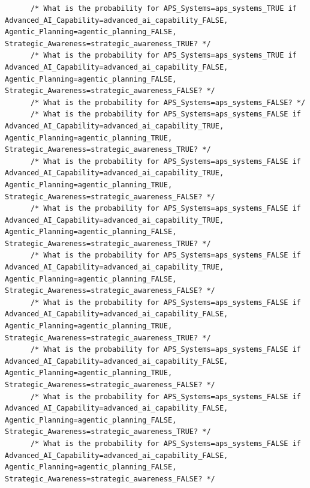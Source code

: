 \documentclass[
  11pt,
  letterpaper,
]{book}
\begin{document}
\begin{verbatim}
      /* What is the probability for APS_Systems=aps_systems_TRUE if Advanced_AI_Capability=advanced_ai_capability_FALSE, Agentic_Planning=agentic_planning_FALSE, Strategic_Awareness=strategic_awareness_TRUE? */
      /* What is the probability for APS_Systems=aps_systems_TRUE if Advanced_AI_Capability=advanced_ai_capability_FALSE, Agentic_Planning=agentic_planning_FALSE, Strategic_Awareness=strategic_awareness_FALSE? */
      /* What is the probability for APS_Systems=aps_systems_FALSE? */
      /* What is the probability for APS_Systems=aps_systems_FALSE if Advanced_AI_Capability=advanced_ai_capability_TRUE, Agentic_Planning=agentic_planning_TRUE, Strategic_Awareness=strategic_awareness_TRUE? */
      /* What is the probability for APS_Systems=aps_systems_FALSE if Advanced_AI_Capability=advanced_ai_capability_TRUE, Agentic_Planning=agentic_planning_TRUE, Strategic_Awareness=strategic_awareness_FALSE? */
      /* What is the probability for APS_Systems=aps_systems_FALSE if Advanced_AI_Capability=advanced_ai_capability_TRUE, Agentic_Planning=agentic_planning_FALSE, Strategic_Awareness=strategic_awareness_TRUE? */
      /* What is the probability for APS_Systems=aps_systems_FALSE if Advanced_AI_Capability=advanced_ai_capability_TRUE, Agentic_Planning=agentic_planning_FALSE, Strategic_Awareness=strategic_awareness_FALSE? */
      /* What is the probability for APS_Systems=aps_systems_FALSE if Advanced_AI_Capability=advanced_ai_capability_FALSE, Agentic_Planning=agentic_planning_TRUE, Strategic_Awareness=strategic_awareness_TRUE? */
      /* What is the probability for APS_Systems=aps_systems_FALSE if Advanced_AI_Capability=advanced_ai_capability_FALSE, Agentic_Planning=agentic_planning_TRUE, Strategic_Awareness=strategic_awareness_FALSE? */
      /* What is the probability for APS_Systems=aps_systems_FALSE if Advanced_AI_Capability=advanced_ai_capability_FALSE, Agentic_Planning=agentic_planning_FALSE, Strategic_Awareness=strategic_awareness_TRUE? */
      /* What is the probability for APS_Systems=aps_systems_FALSE if Advanced_AI_Capability=advanced_ai_capability_FALSE, Agentic_Planning=agentic_planning_FALSE, Strategic_Awareness=strategic_awareness_FALSE? */

\end{verbatim}
\end{document}

